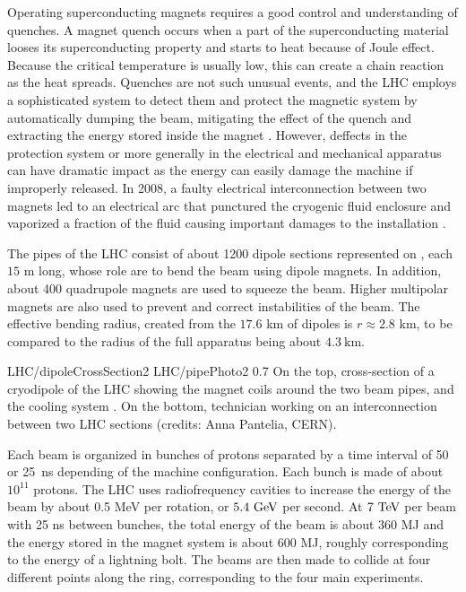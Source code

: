     Operating superconducting magnets requires a good control and understanding of quenches.
    A magnet quench occurs when a part of the superconducting material looses its superconducting
    property and starts to heat because of Joule effect. Because the critical temperature
    is usually low, this can create a chain reaction as the heat spreads. Quenches are
    not such unusual events, and the LHC employs a sophisticated system to detect them and protect
    the magnetic system by automatically dumping the beam, mitigating the effect of the
    quench and extracting the energy stored inside the magnet \cite{LHCmagnets}.
    However, deffects in the protection
    system or more generally in the electrical and mechanical apparatus can have dramatic
    impact as the energy can easily damage the machine if improperly released. In 2008,
    a faulty electrical interconnection between two magnets led to an electrical arc that
    punctured the cryogenic fluid enclosure and vaporized a fraction of the fluid causing
    important damages to the installation \cite{LHCindicent}.

    The pipes of the LHC consist of about 1200 dipole sections represented on
    , each $15$ m long, whose role are to bend the beam using dipole
    magnets. In addition, about 400 quadrupole magnets are used to squeeze the
    beam. Higher multipolar magnets are also used to prevent and correct instabilities of
    the beam. The effective bending radius, created from the $17.6$ km of dipoles is
    $r \approx 2.8$ km, to be compared to the radius of the full apparatus being about $4.3~\text{km}$.

                     {LHC/dipoleCrossSection2}
                     {LHC/pipePhoto2}
                     {0.7}
                     {On the top, cross-section of a cryodipole of the LHC
                     showing the magnet coils around the two beam pipes, and the cooling system \cite{LHC}.
                     On the bottom, technician working on an interconnection between two LHC
                     sections (credits: Anna Pantelia, CERN).}

    Each beam is organized in bunches of protons separated by a time interval of 50 or
    25~ns depending of the machine configuration. Each bunch is made of about $10^{11}$
    protons. The LHC uses radiofrequency cavities to increase the energy of the beam by
    about 0.5 MeV per rotation, or $5.4~\text{GeV}$ per second. At $7~\text{TeV}$ per beam with 25 ns
    between bunches, the total energy of the beam is about 360 MJ and the energy stored
    in the magnet system is about 600 MJ, roughly corresponding to the energy of a
    lightning bolt. The beams are then made to collide at four different points along the
    ring, corresponding to the four main experiments.

